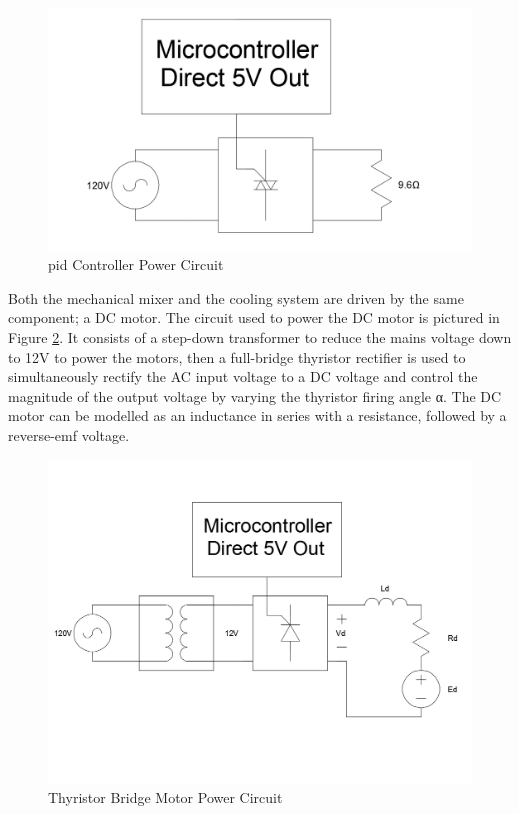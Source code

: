 \documentclass{article}
\begin{document}
\begin{figure}[H]
\begin{center}
\includegraphics[scale=0.20]{heater-pid-circuit.png}
\caption{\gls{pid} Controller Power Circuit}
\label{fig:heater-pid-circuit}
\end{center}
\end{figure}

Both the mechanical mixer and the cooling system are driven by the same component; a DC motor. The circuit used to power the DC motor is pictured in Figure \ref{fig:motor-thyristor-dc-circuit}. It consists of a step-down transformer to reduce the mains voltage down to 12V to power the motors, then a full-bridge thyristor rectifier is used to simultaneously rectify the AC input voltage to a DC voltage and control the magnitude of the output voltage by varying the thyristor firing angle α. The DC motor can be modelled as an inductance in series with a resistance, followed by a reverse-emf voltage.

\begin{figure}[H]
\begin{center}
\includegraphics[scale=0.20]{motor-thyristor-dc-circuit.png}
\caption{Thyristor Bridge Motor Power Circuit}
\label{fig:motor-thyristor-dc-circuit}
\end{center}
\end{figure}
\end{document}
